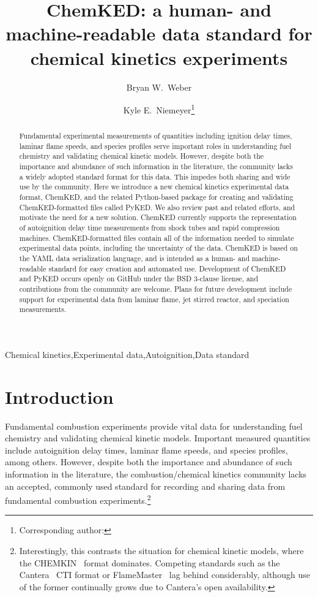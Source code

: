 \documentclass[12pt]{ijck}
\title{ ChemKED: a human- and machine-readable data standard for chemical kinetics experiments }
\author[1]{Bryan W.~Weber}
\author[2]{Kyle E.~Niemeyer\thanks{Corresponding author: \email{kyle.niemeyer@oregonstate.edu}}}
\affil[1]{Department of Mechanical Engineering, University of Connecticut, Storrs, CT, USA}
\affil[2]{School of Mechanical, Industrial, and Manufacturing Engineering, Oregon State University, Corvallis, OR, USA}
\begin{document}
\maketitle

\begin{keyword}
    Chemical kinetics\sep Experimental data\sep Autoignition\sep Data standard \\
\end{keyword}

\begin{abstract} %
Fundamental experimental measurements of quantities including ignition delay times,
laminar flame speeds, and species profiles serve important roles in understanding
fuel chemistry and validating chemical kinetic models. However, despite both the
importance and abundance of such information in the literature, the community lacks
a widely adopted standard format for this data. This impedes both sharing and wide
use by the community. Here we introduce a new chemical kinetics
experimental data format, ChemKED, and the related Python-based package for creating
and validating ChemKED-formatted files called PyKED. We also review past and
related efforts, and motivate the need for a new solution. ChemKED currently supports
the representation of autoignition delay time measurements from shock tubes and rapid
compression machines.
ChemKED-formatted files contain all of the information needed to simulate experimental
data points, including the uncertainty of the data. ChemKED is based on the YAML data
serialization language, and is intended as a human- and machine-readable standard for
easy creation and automated use.
Development of ChemKED and PyKED occurs openly on GitHub under the
BSD 3-clause license, and contributions from the community are welcome. Plans for
future development include support for experimental data from laminar flame,
jet stirred reactor, and speciation measurements.
\end{abstract}


\section{Introduction}
%
Fundamental combustion experiments provide vital data for understanding fuel
chemistry and validating chemical kinetic models. Important measured quantities
include autoignition delay times, laminar flame speeds, and species profiles,
among others. However, despite both the importance and abundance of such
information in the literature, the combustion\slash chemical kinetics community
lacks an accepted, commonly used standard for recording and sharing data from
fundamental combustion experiments.\footnote{Interestingly, this contrasts the
situation for chemical kinetic models, where the CHEMKIN~\autocite{Kee:1996ck}
format dominates. Competing standards such as the
Cantera~\autocite{Cantera:2.3.0} CTI format or
FlameMaster~\autocite{FlameMaster:ref} lag behind considerably,
although use of the former continually grows due to Cantera's open availability.
}
\end{document}
